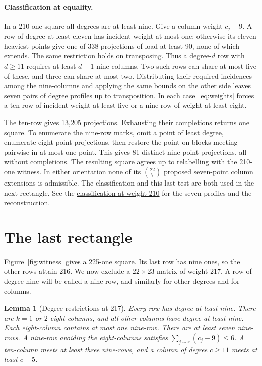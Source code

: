 \documentclass[11pt]{article}
\newtheorem{lemma}[theorem]{Lemma}
\newcommand{\proofdir}[2]{\href{https://github.com/jasondavies/zarankiewicz-numbers/blob/b33dcd207d62331adc02e1cb6ef0021094ebd40b/#1}{#2}}
\begin{document}
\paragraph{Classification at equality.}
In a 210-one square all degrees are at least nine. Give a column
weight $c_j-9$. A row of degree at least eleven has incident weight at
most one: otherwise its eleven heaviest points give one of 338
projections of load at least 90, none of which extends. The same
restriction holds on transposing. Thus a degree-$d$ row with $d\ge11$
requires at least $d-1$ nine-columns. Two such rows can share at
most five of these, and three can share at most two. Distributing
their required incidences among the nine-columns and applying the
same bounds on the other side leaves seven pairs of degree profiles
up to transposition. In each case~\eqref{eq:weights} forces a ten-row
of incident weight at least five or a nine-row of weight at least eight.

The ten-row gives 13,205 projections. Exhausting their completions
returns one square. To enumerate the nine-row marks, omit a point of
least degree, enumerate eight-point projections, then restore the point
on blocks meeting pairwise in at most one point. This gives 81 distinct
nine-point projections, all without completions. The resulting square
agrees up to relabelling with the 210-one witness. In either orientation
none of its $\binom{22}{7}$ proposed seven-point column extensions is
admissible. The classification and this last test are both used in
the next rectangle. See the \proofdir{z22-k33/unique.md}{classification
at weight 210} for the seven profiles and the reconstruction.

\section{The last rectangle}\label{sec:217}
Figure~\ref{fig:witness} gives a 225-one square. Its last row has nine
ones, so the other rows attain 216. We now exclude a $22\times23$ matrix
of weight 217. A row of degree nine will be called a nine-row, and
similarly for other degrees and for columns.

\begin{lemma}[Degree restrictions at 217]\label{lem:input}
Every row has degree at least nine. There are $k=1$ or $2$ eight-columns,
and all other columns have degree at least nine. Each eight-column
contains at most one nine-row. There are at least seven nine-rows.
A nine-row avoiding the eight-columns satisfies $\sum_{j\sim r}(c_j-9)\le6$.
A ten-column meets at least three nine-rows, and a column of degree
$c\ge11$ meets at least $c-5$.
\end{lemma}
\end{document}
